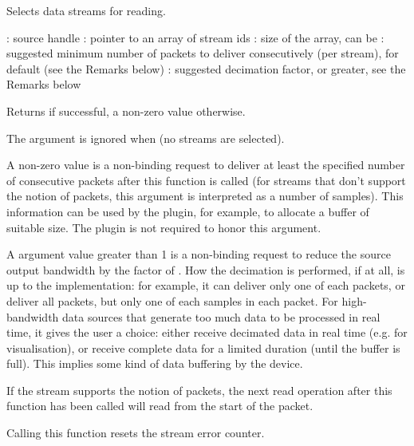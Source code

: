 \documentclass[a4paper,12pt,twoside,extrafontsizes]{memoir}
\begin{document}
\begin{funcdescr}
	Selects data streams for reading.
\end{funcdescr}

\begin{funcparams}
	: source handle
	: pointer to an array of stream ids
	: size of the array, can be 
	: suggested minimum number of packets to deliver consecutively (per stream),  for default (see the Remarks below)
	: suggested decimation factor,  or greater, see the Remarks below
\end{funcparams}

\begin{funcret}
	Returns  if successful, a non-zero value otherwise.
\end{funcret}

\begin{funcremarks}
	The  argument is ignored when  (no streams are selected).
	
	A non-zero  value is a non-binding request to deliver at least the specified number of consecutive packets after this function is called (for streams that don't support the notion of packets, this argument is interpreted as a number of samples). This information can be used by the plugin, for example, to allocate a buffer of suitable size. The plugin is not required to honor this argument.
	
	A  argument value greater than 1 is a non-binding request to reduce the source output bandwidth by the factor of . How the decimation is performed, if at all, is up to the implementation: for example, it can deliver only one of each  packets, or deliver all packets, but only one of each  samples in each packet. For high-bandwidth data sources that generate too much data to be processed in real time, it gives the user a choice: either receive decimated data in real time (e.g. for visualisation), or receive complete data for a limited duration (until the buffer is full). This implies some kind of data buffering by the device.
	
	If the stream supports the notion of packets, the next read operation after this function has been called will read from the start of the packet.
	
	Calling this function resets the stream error counter.
\end{funcremarks}
\end{document}
